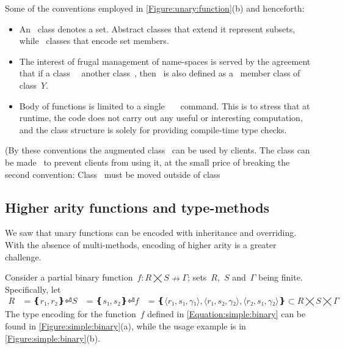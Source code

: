 Some of the conventions employed in \cref{Figure:unary:function}(b) and henceforth:
\begin{itemize}
  \item An~ class denotes a set. Abstract classes that extend it represent
      subsets, while~ classes that encode set members.
  \item The interest of frugal management of name-spaces is served by the agreement that if
    a class~~ another class~, then~ is also defined
    as a~ member class of class~$Y$.
  \item Body of functions is limited to a single~~~\cc{;} command.
    This is to stress that at runtime, the code does not carry out any useful or interesting computation,
      and the class structure is solely for providing compile-time type checks.
\end{itemize}
(By these conventions the augmented class~ can be used by clients.
The class can be made~ to prevent clients from using it,
  at the small price of breaking the second convention:
  Class~ must be moved outside of class~

\subsection{Higher arity functions and type-methods}
We saw that unary functions can be encoded with inheritance and overriding. 
With the absence of multi-methods, encoding of higher arity is a greater challenge. 

Consider a partial binary function~$f: R⨉S↛Γ$; sets~$R$,~$S$ and~$Γ$ being finite. 
Specifically, let
\begin{equation}
  \label{Equation:simple:binary}
\begin{split}
  R & = ❴ r₁, r₂❵⏎
  S & = ❴ s₁, s₂❵⏎
  f & = ❴ ⟨r₁, s₁,γ₁⟩, ⟨r₁, s₂,γ₂⟩, ⟨r₂, s₁,γ₂⟩ ❵ ⊂R⨉S⨉Γ
\end{split}
\end{equation}
The \Java type encoding for the function~$f$ defined in \cref{Equation:simple:binary}
  can be found in \cref{Figure:simple:binary}(a), while the usage example is in
  \cref{Figure:simple:binary}(b).

